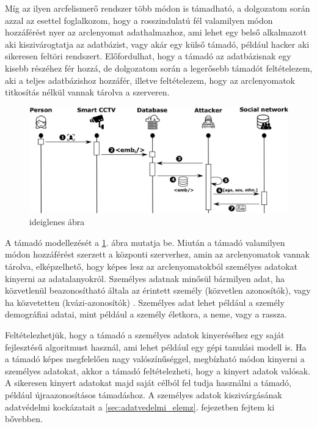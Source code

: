 Míg az ilyen arcfelismerő rendszer több módon is támadható, a dolgozatom során azzal az esettel foglalkozom, hogy a rosszindulatú fél valamilyen módon hozzáférést nyer az arclenyomat adathalmazhoz, ami lehet egy belső alkalmazott aki kiszivárogtatja az adatbázist, vagy akár egy külső támadó, például hacker aki sikeresen feltöri rendszert. Előfordulhat, hogy a támadó az adatbázisnak egy kisebb részéhez fér hozzá, de dolgozatom során a legerősebb támadót feltételezem, aki a teljes adatbázishoz hozzáfér, illetve feltételezem, hogy az arclenyomatok titkosítás nélkül vannak tárolva a szerveren.

\begin{figure}[ht]
	\centering
	\includegraphics[width=1\columnwidth]{figures/attacker_model.png}
	\caption{ideiglenes ábra}
	\label{fig:attacker}
\end{figure}

A támadó modellezését a \ref{fig:attacker}. ábra mutatja be. Miután a támadó valamilyen módon hozzáférést szerzett a központi szerverhez, amin az arclenyomatok vannak tárolva, elképzelhető, hogy képes lesz az arclenyomatokból személyes adatokat kinyerni az adatalanyokról. Személyes adatnak minősül bármilyen adat, ha közvetlenül beazonosítható általa az érintett személy (közvetlen azonosítók), vagy ha közvetetten (kvázi-azonosítók) \cite{GDPR2018}. Személyes adat lehet például a személy demográfiai adatai, mint például a személy életkora, a neme, vagy a rassza. 

Feltételezhetjük, hogy a támadó a személyes adatok kinyeréséhez egy saját fejlesztésű algoritmust használ, ami lehet például egy gépi tanulási modell is. Ha a támadó képes megfelelően nagy valószínűséggel, megbízható módon kinyerni a személyes adatokat, akkor a támadó feltételezheti, hogy a kinyert adatok valósak. A sikeresen kinyert adatokat majd saját célból fel tudja használni a támadó, például újraazonosításos támadáshoz. A személyes adatok kiszivárgásának adatvédelmi kockázatait a \ref{sec:adatvedelmi_elemz}. fejezetben fejtem ki bővebben.

